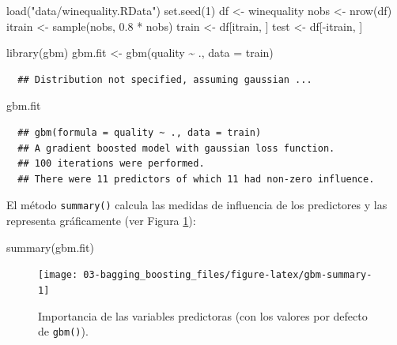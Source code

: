 \documentclass[
]{book}
\newenvironment{Shaded}{\begin{snugshade}}{\end{snugshade}}
\newcommand{\AttributeTok}[1]{\textcolor[rgb]{0.77,0.63,0.00}{#1}}
\newcommand{\DecValTok}[1]{\textcolor[rgb]{0.00,0.00,0.81}{#1}}
\newcommand{\FloatTok}[1]{\textcolor[rgb]{0.00,0.00,0.81}{#1}}
\newcommand{\FunctionTok}[1]{\textcolor[rgb]{0.00,0.00,0.00}{#1}}
\newcommand{\NormalTok}[1]{#1}
\newcommand{\OtherTok}[1]{\textcolor[rgb]{0.56,0.35,0.01}{#1}}
\newcommand{\SpecialCharTok}[1]{\textcolor[rgb]{0.00,0.00,0.00}{#1}}
\newcommand{\StringTok}[1]{\textcolor[rgb]{0.31,0.60,0.02}{#1}}
\theoremstyle{break}
\theoremstyle{nonumberplain}
\begin{document}
\begin{Shaded}
\begin{Highlighting}[]
\FunctionTok{load}\NormalTok{(}\StringTok{"data/winequality.RData"}\NormalTok{)}
\FunctionTok{set.seed}\NormalTok{(}\DecValTok{1}\NormalTok{)}
\NormalTok{df }\OtherTok{\textless{}{-}}\NormalTok{ winequality}
\NormalTok{nobs }\OtherTok{\textless{}{-}} \FunctionTok{nrow}\NormalTok{(df)}
\NormalTok{itrain }\OtherTok{\textless{}{-}} \FunctionTok{sample}\NormalTok{(nobs, }\FloatTok{0.8} \SpecialCharTok{*}\NormalTok{ nobs)}
\NormalTok{train }\OtherTok{\textless{}{-}}\NormalTok{ df[itrain, ]}
\NormalTok{test }\OtherTok{\textless{}{-}}\NormalTok{ df[}\SpecialCharTok{{-}}\NormalTok{itrain, ]}

\FunctionTok{library}\NormalTok{(gbm)}
\NormalTok{gbm.fit }\OtherTok{\textless{}{-}} \FunctionTok{gbm}\NormalTok{(quality }\SpecialCharTok{\textasciitilde{}}\NormalTok{ ., }\AttributeTok{data =}\NormalTok{ train)}
\end{Highlighting}
\end{Shaded}

\begin{verbatim}
  ## Distribution not specified, assuming gaussian ...
\end{verbatim}

\begin{Shaded}
\begin{Highlighting}[]
\NormalTok{gbm.fit}
\end{Highlighting}
\end{Shaded}

\begin{verbatim}
  ## gbm(formula = quality ~ ., data = train)
  ## A gradient boosted model with gaussian loss function.
  ## 100 iterations were performed.
  ## There were 11 predictors of which 11 had non-zero influence.
\end{verbatim}

El método \texttt{summary()} calcula las medidas de influencia de los predictores y las representa gráficamente (ver Figura \ref{fig:gbm-summary}):



\begin{Shaded}
\begin{Highlighting}[]
\FunctionTok{summary}\NormalTok{(gbm.fit)}
\end{Highlighting}
\end{Shaded}

\begin{figure}[!htb]

{\centering \texttt{[image: 03-bagging\_boosting\_files/figure-latex/gbm-summary-1]} 

}

\caption{Importancia de las variables predictoras (con los valores por defecto de \texttt{gbm()}).}\label{fig:gbm-summary}
\end{figure}
\end{document}
